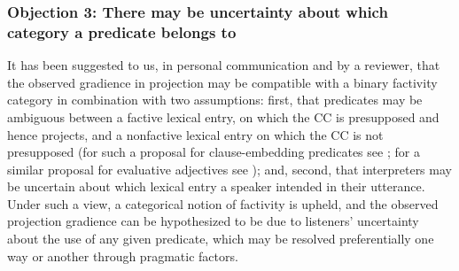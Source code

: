 \documentclass{language}
\newcommand{\6}{\mbox{$[\hspace*{-.6mm}[$}}
\newcommand{\9}{\mbox{$]\hspace*{-.6mm}]$}}
\begin{document}

\subsubsection{Objection 3: There may be uncertainty about which category a predicate belongs to}\label{s-obj3}

It has been suggested to us, in personal communication and by a reviewer, that the observed gradience in projection may be compatible with a binary factivity category in combination with two assumptions: first, that predicates may be ambiguous between a factive lexical entry, on which the CC is presupposed and hence projects, and a nonfactive lexical entry on which the CC is not presupposed (for such a proposal for clause-embedding predicates see \citealt[1736]{spector-egre2015}; for a similar proposal for evaluative adjectives see \citealt{karttunen-etal2014}); and, second, that interpreters may be uncertain about which lexical entry a speaker intended in their utterance. Under such a view, a categorical notion of factivity is upheld, and the observed projection gradience can be hypothesized to be due to listeners' uncertainty about the use of any given predicate, which may be resolved preferentially one way or another through pragmatic factors.

\end{document}
